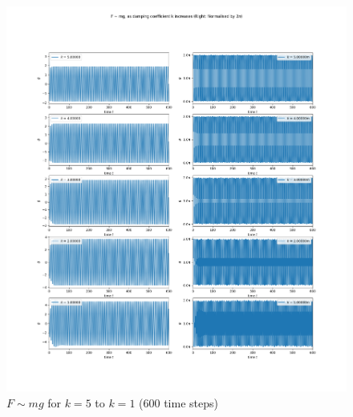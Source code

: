 \documentclass[10pt, twocolumn]{article}
\begin{document}
\begin{figure}[H]
    \centering
    \includegraphics[width = \columnwidth]{Projects/ForcedSimplePendulum/Plots/F~mg as damping coefficient k increases from 5 to 1 (long).png}
    \caption{$F \sim{mg}$ for $k = 5$ to $k = 1$ (600 time steps)}
    \label{k 5 to 1 long}
\end{figure}
\end{document}
